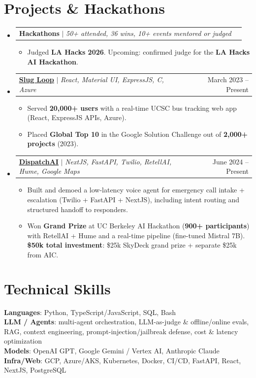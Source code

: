 \documentclass[letterpaper,11pt]{article}
\makeatletter
\newcommand{\resumeItem}[1]{
  \item\small{
    {#1 \vspace{-2pt}}
  }
}
\newcommand{\resumeProjectHeading}[2]{
    \item
    \begin{tabular*}{0.97\textwidth}{l@{\extracolsep{\fill}}r}
      \small#1 & #2 \\
    \end{tabular*}\vspace{-5pt}
}
\newcommand{\resumeSubHeadingListStart}{\begin{itemize}[leftmargin=0.15in, label={}]}
\newcommand{\resumeSubHeadingListEnd}{\end{itemize}}
\newcommand{\resumeItemListStart}{\begin{itemize}}
\newcommand{\resumeItemListEnd}{\end{itemize}\vspace{-9pt}}
\makeatother
\begin{document}
\section{Projects \& Hackathons}
    \resumeSubHeadingListStart
      \resumeProjectHeading
          {\textbf{Hackathons} $|$ \emph{50+ attended, 36 wins, 10+ events mentored or judged}}{}
          \resumeItemListStart
            \resumeItem{Judged \textbf{LA Hacks 2026}. Upcoming: confirmed judge for the \textbf{LA Hacks AI Hackathon}.}
          \resumeItemListEnd
      \resumeProjectHeading
          {\textbf{\href{https://www.slugloop.tech/}{\underline{Slug Loop}}} $|$ \emph{React, Material UI, ExpressJS, C, Azure}}{March 2023 -- Present}
          \resumeItemListStart
            \resumeItem{Served \textbf{20,000+ users} with a real-time UCSC bus tracking web app (React, ExpressJS APIs, Azure).}
            \resumeItem{Placed \textbf{Global Top 10} in the Google Solution Challenge out of \textbf{2,000+ projects} (2023).}
          \resumeItemListEnd
      \resumeProjectHeading
          {\textbf{\href{https://dispatchai.art3m1s.me/}{\underline{DispatchAI}}} $|$ \emph{NextJS, FastAPI, Twilio, RetellAI, Hume, Google Maps}}{June 2024 -- Present}
          \resumeItemListStart
            \resumeItem{Built and demoed a low-latency voice agent for emergency call intake + escalation (Twilio + FastAPI + NextJS), including intent routing and structured handoff to responders.}
            \resumeItem{Won \textbf{Grand Prize} at UC Berkeley AI Hackathon (\textbf{900+ participants}) with RetellAI + Hume and a real-time pipeline (fine-tuned Mistral 7B). \textbf{\$50k total investment}: \$25k SkyDeck grand prize + separate \$25k from AIC.}
          \resumeItemListEnd
    \resumeSubHeadingListEnd

\section{Technical Skills}
 \begin{itemize}[leftmargin=0.15in, label={}]
    \small{\item{
     \textbf{Languages}{: Python, TypeScript/JavaScript, SQL, Bash} \\
     \textbf{LLM / Agents}{: multi-agent orchestration, LLM-as-judge \& offline/online evals, RAG, context engineering, prompt-injection/jailbreak defense, cost \& latency optimization} \\
     \textbf{Models}{: OpenAI GPT, Google Gemini / Vertex AI, Anthropic Claude} \\
     \textbf{Infra/Web}{: GCP, Azure/AKS, Kubernetes, Docker, CI/CD, FastAPI, React, NextJS, PostgreSQL}
    }}
 \end{itemize}


\end{document}
